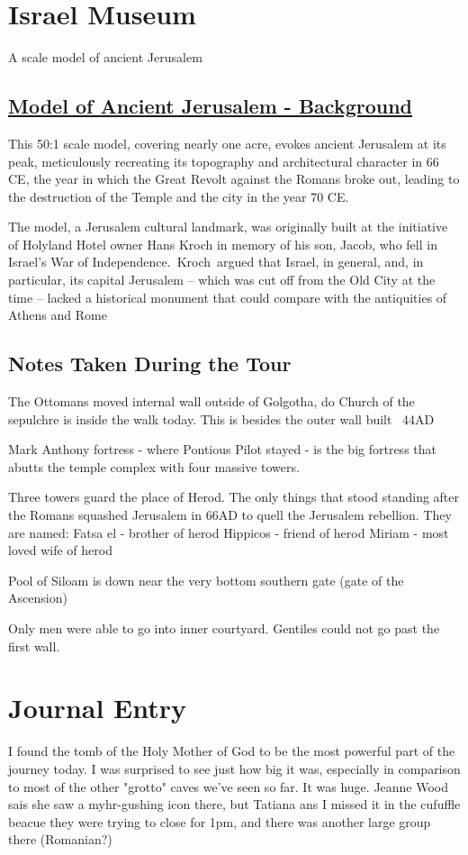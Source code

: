 \documentclass[letterpaper]{report}
\begin{document}
\section{Israel Museum}
A scale model of ancient Jerusalem
\begin{multicols}{2}

\subsection{	\href{http://www.english.imjnet.org.il/page_1382}{
Model of Ancient Jerusalem -  Background}}
This 50:1 scale model, covering nearly one acre, evokes ancient Jerusalem at its peak, meticulously recreating its topography and architectural character in 66 CE, the year in which the Great Revolt against the Romans broke out, leading to the destruction of the Temple and the city in the year 70 CE. 

The model, a Jerusalem cultural landmark, was originally built at the initiative of Holyland Hotel owner Hans Kroch in memory of his son, Jacob, who fell in Israel's War of Independence. Kroch argued that Israel, in general, and, in particular, its capital Jerusalem – which was cut off from the Old City at the time – lacked a historical monument that could compare with the antiquities of Athens and Rome

\subsection{Notes Taken During the Tour}
The Ottomans moved internal wall outside of Golgotha, do Church of the sepulchre is inside the walk today. This is besides the outer wall built ~44AD

Mark Anthony fortress - where Pontious Pilot stayed -
is the big fortress that abutts the temple complex with four massive towers.

Three towers guard the place of Herod. The only things that stood standing after the Romans squashed Jerusalem in 66AD to quell the Jerusalem rebellion. They are named:
Fatsa el - brother of herod
Hippicos - friend of herod
Miriam - most loved wife of herod

Pool of Siloam is down near the very bottom southern gate (gate of the Ascension)

Only men were able to go into inner courtyard. Gentiles could not go past the first wall.

\end{multicols}


\section{Journal Entry}
I found the tomb of the Holy Mother of God to be the most powerful part of the journey today.
I was surprised to see just
how big it was, especially in comparison to most of the other "grotto" caves we've
seen so far. It was huge.
Jeanne Wood sais she saw a myhr-gushing icon there, but Tatiana ans I missed it in the cufuffle beacue they were trying to close for 1pm, and there was another large group there (Romanian?)
\end{document}
